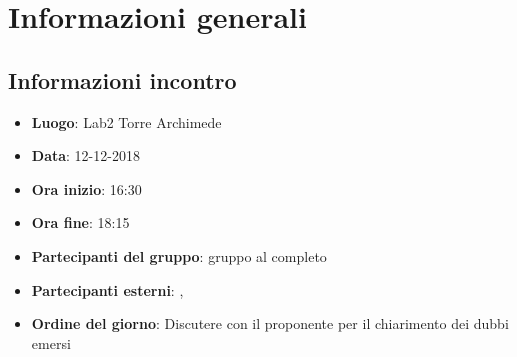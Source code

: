 \newcommand{\documento}{\VE}
\newcommand{\nomedocumentofisico}{VE\_12\_12\_2018.pdf}
\newcommand{\redazione}{\NC}
\newcommand{\verifica}{\MM}
\newcommand{\approvazione}{\SG}
\newcommand{\versione}{1.0.0}
\newcommand{\uso}{Esterno}
\newcommand{\destinateTo}{\TV, \\ & \RC, \\ & \II}
\newcommand{\datacreazione}{15 dicembre 2018}
\newcommand{\datamodifica}{17 dicembre 2018}
\newcommand{\stato}{Approvato}

\def\TABELLE{false}	%
\def\FIGURE{false} 	%






    

    
    
	
    
    \section{Informazioni generali}
		\subsection{Informazioni incontro}
			\begin{itemize}
				\item { \textbf{Luogo}:  Lab2 Torre Archimede}
				\item { \textbf{Data}: 12-12-2018}
				\item { \textbf{Ora inizio}: 16:30}
				\item { \textbf{Ora fine}: 18:15}
				\item { \textbf{Partecipanti del gruppo}: gruppo al completo}
				\item { \textbf{Partecipanti esterni}: {\LuC}, {\DZ}}
				\item { \textbf{Ordine del giorno}: Discutere con il proponente per il chiarimento dei dubbi emersi}
			\end{itemize}

